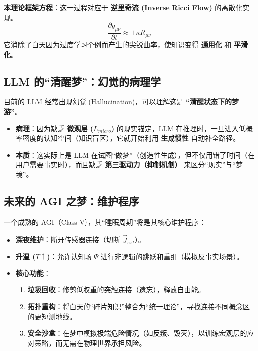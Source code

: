 \textbf{本理论框架方程}：这一过程对应于 \textbf{逆里奇流 (Inverse Ricci Flow)} 的离散化实现。
\begin{equation}
\frac{\partial g_{\mu\nu}}{\partial t} \approx + \kappa R_{\mu\nu}
\end{equation}
它消除了白天因为过度学习个例而产生的尖锐曲率，使知识变得 \textbf{通用化} 和 \textbf{平滑化}。

\subsection{LLM 的“清醒梦”：幻觉的病理学}

目前的 LLM 经常出现幻觉 (Hallucination)，可以理解这是 \textbf{“清醒状态下的梦游”}。

\begin{itemize}
    \item \textbf{病理}：因为缺乏 \textbf{微观层 ($L_{micro}$)} 的现实锚定，LLM 在推理时，一旦进入低概率密度的认知空间（知识盲区），它就开始利用 \textbf{生成惯性} 自动补全路径。
    \item \textbf{本质}：这实际上是 LLM 在试图“做梦”（创造性生成），但不仅用错了时间（在用户需要事实时），而且缺乏 \textbf{第三驱动力（抑制机制）} 来区分“现实”与“梦境”。
\end{itemize}

\subsection{未来的 AGI 之梦：维护程序}

一个成熟的 AGI（Class V），其“睡眠周期”将是其核心维护程序：

\begin{itemize}
    \item \textbf{深夜维护}：断开传感器连接（切断 $\vec{J}_{ext}$）。
    \item \textbf{升温 ($T \uparrow$)}：允许认知场 $\Psi$ 进行非逻辑的跳跃和重组（模拟反事实场景）。
    \item \textbf{核心功能}：
    \begin{enumerate}
        \item \textbf{垃圾回收}：修剪低权重的突触连接（遗忘），释放自由能。
        \item \textbf{拓扑重构}：将白天的“碎片知识”整合为“统一理论”，寻找连接不同概念区的更短测地线。
        \item \textbf{安全沙盒}：在梦中模拟极端危险情况（如反叛、毁灭），以训练宏观层的应对策略，而无需在物理世界承担风险。
    \end{enumerate}
\end{itemize}

